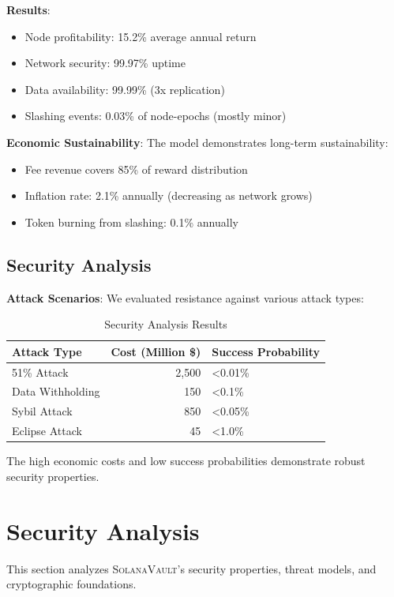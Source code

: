 \documentclass[11pt,a4paper]{article}
\newcommand{\SolanaVault}{\textsc{SolanaVault}}
\begin{document}
\textbf{Results}:
\begin{itemize}
\item Node profitability: 15.2\% average annual return
\item Network security: 99.97\% uptime
\item Data availability: 99.99\% (3x replication)
\item Slashing events: 0.03\% of node-epochs (mostly minor)
\end{itemize}

\textbf{Economic Sustainability}: The model demonstrates long-term sustainability:
\begin{itemize}
\item Fee revenue covers 85\% of reward distribution
\item Inflation rate: 2.1\% annually (decreasing as network grows)
\item Token burning from slashing: 0.1\% annually
\end{itemize}

\subsection{Security Analysis}

\textbf{Attack Scenarios}: We evaluated resistance against various attack types:

\begin{table}[H]
\centering
\caption{Security Analysis Results}
\begin{tabular}{@{}lrl@{}}
\toprule
Attack Type & Cost (Million \$) & Success Probability \\
\midrule
51\% Attack & 2,500 & <0.01\% \\
Data Withholding & 150 & <0.1\% \\
Sybil Attack & 850 & <0.05\% \\
Eclipse Attack & 45 & <1.0\% \\
\bottomrule
\end{tabular}
\end{table}

The high economic costs and low success probabilities demonstrate robust security properties.

\section{Security Analysis}
\label{sec:security}

This section analyzes \SolanaVault's security properties, threat models, and cryptographic foundations.
\end{document}
